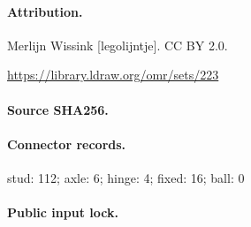 \paragraph{Attribution.}Merlijn Wissink [legolijntje]. CC BY 2.0.\par\url{https://library.ldraw.org/omr/sets/223}
\paragraph{Source SHA256.}
\paragraph{Connector records.}stud: 112; axle: 6; hinge: 4; fixed: 16; ball: 0
\paragraph{Public input lock.}
